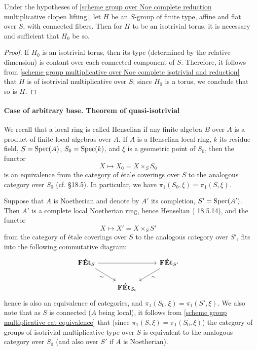 \begin{corollary}\label{scheme group over Noe complete isotrivial torus iff reduction}
Under the hypotheses of \cref{scheme group over Noe complete reduction multiplicative clopen lifting}, let $H$ be an $S$-group of finite type, affine and flat over $S$, with connected fibers. Then for $H$ to be an isotrivial torus, it is necessary and sufficient that $H_0$ be so.
\end{corollary}
\begin{proof}
If $H_0$ is an isotrivial torus, then its type (determined by the relative dimension) is contant over each connected component of $S$. Therefore, it follows from \cref{scheme group multiplicative over Noe complete isotrivial and reduction} that $H$ is of isotrivial multiplicative over $S$; since $H_0$ is a torus, we conclude that so is $H$.
\end{proof}

\paragraph{Case of arbitrary base. Theorem of quasi-isotrivial}
We recall that a local ring is called Henselian if any finite algebra $B$ over $A$ is a product of finite local algebras over $A$. If $A$ is a Henselian local ring, $k$ its residue field, $S=\mathrm{Spec}(A)$, $S_0=\mathrm{Spec}(k)$, and $\xi$ is a geometric point of $S_0$, then the functor
\[X\mapsto X_0=X\times_SS_0\]
is an equivalence from the category of \'etale coverings over $S$ to the analogous category over $S_0$ (cf. \cite{EGA4-4} \S 18.5). In particular, we have $\pi_1(S_0,\xi)=\pi_1(S,\xi)$.\par
Suppose that $A$ is Noetherian and denote by $A'$ its completion, $S'=\mathrm{Spec}(A')$. Then $A'$ is a complete local Noetherian ring, hence Henselian (\cite{EGA4-4} 18.5.14), and the functor
\[X\mapsto X'=X\times_SS'\] 
from the category of \'etale coverings over $S$ to the analogous category over $S'$, fits into the following commutative diagram:
\[\begin{tikzcd}
\FEt_S\ar[rr]\ar[rd,swap,"\sim"]&&\FEt_{S'}\ar[ld,"\sim"]\\
&\FEt_{S_0}&
\end{tikzcd}\]
hence is also an equivalence of categories, and $\pi_1(S_0,\xi)=\pi_1(S',\xi)$. We also note that as $S$ is connected ($A$ being local), it follows from \cref{scheme group multiplicative cat equivalence} that (since $\pi_1(S,\xi)=\pi_1(S_0,\xi)$) the category of groups of isotrivial multiplicative type over $S$ is equivalent to the analogous category over $S_0$ (and also over $S'$ if $A$ is Noetherian).

